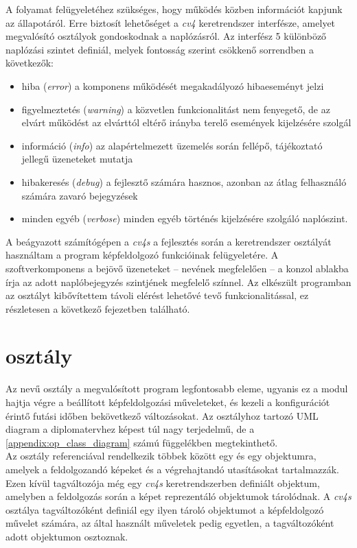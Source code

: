 A folyamat felügyeletéhez szükséges, hogy működés közben információt kapjunk az állapotáról. Erre biztosít lehetőséget a \emph{cv4} keretrendszer  interfésze, amelyet megvalósító osztályok gondoskodnak a naplózásról. Az interfész 5 különböző naplózási szintet definiál, melyek fontosság szerint csökkenő sorrendben a következők:
\begin{itemize}
\item hiba (\emph{error}) a komponens működését megakadályozó hibaeseményt jelzi
\item figyelmeztetés (\emph{warning}) a közvetlen funkcionalitást nem fenyegető, de az elvárt működést az elvárttól eltérő irányba terelő események kijelzésére szolgál
\item információ (\emph{info}) az alapértelmezett üzemelés során fellépő, tájékoztató jellegű üzeneteket mutatja
\item hibakeresés (\emph{debug}) a fejlesztő számára hasznos, azonban az átlag felhasználó számára zavaró bejegyzések
\item minden egyéb (\emph{verbose}) minden egyéb történés kijelzésére szolgáló naplószint.
\end{itemize}

A beágyazott számítógépen a \emph{cv4s} a fejlesztés során a keretrendszer  osztályát használtam a program képfeldolgozó funkcióinak felügyeletére. A szoftverkomponens a bejövő üzeneteket -- nevének megfelelően -- a konzol ablakba írja az adott naplóbejegyzés szintjének megfelelő színnel. Az elkészült programban az osztályt kibővítettem távoli elérést lehetővé tevő funkcionalitással, ez részletesen a következő fejezetben található.

\section{ osztály}

Az  nevű osztály a megvalósított program legfontosabb eleme, ugyanis ez a modul hajtja végre a beállított képfeldolgozási műveleteket, és kezeli a konfigurációt érintő futási időben bekövetkező változásokat. Az osztályhoz tartozó UML diagram a diplomatervhez képest túl nagy terjedelmű, de a \ref{appendix:op_class_diagram} számú függelékben megtekinthető.\\
Az osztály referenciával rendelkezik többek között egy  és egy  objektumra, amelyek a feldolgozandó képeket és a végrehajtandó utasításokat tartalmazzák. Ezen kívül tagváltozója még egy \emph{cv4s} keretrendszerben definiált  objektum, amelyben a feldolgozás során a képet reprezentáló  objektumok tárolódnak. A \emph{cv4s}  osztálya tagváltozóként definiál egy ilyen tároló objektumot a képfeldolgozó művelet számára, az  által használt műveletek pedig egyetlen, a tagváltozóként adott  objektumon osztoznak. 


